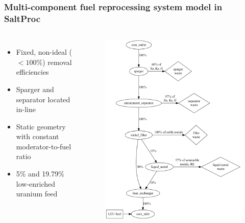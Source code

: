 \begin{frame}
\frametitle{Multi-component fuel reprocessing system model in SaltProc}       

\begin{columns}
		\column[t]{6cm}
		\begin{itemize}
			\item Fixed, non-ideal ($<100\%$) removal efficiencies
			\item Sparger and separator located in-line
			\item Static geometry with constant moderator-to-fuel ratio
			\item 5\% and 19.79\% low-enriched uranium feed
		\end{itemize}

	\column[t]{6.5cm}
	\begin{figure}[htp!] %
	\centering
			\vspace{-7mm}
		\begin{overprint}
	\includegraphics[height=0.8\textheight]{../figures/demo_reprocessing_scheme.png}

\end{overprint}
\end{figure}
\end{columns}
\end{frame}

